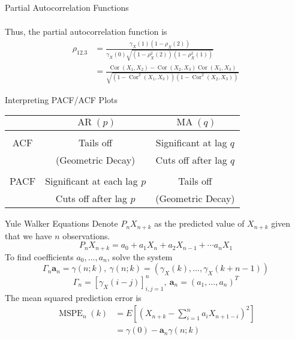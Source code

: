 \documentclass{article}
\DeclareMathOperator{\Cor}{Cor}
\DeclareMathOperator{\ar}{AR}
\DeclareMathOperator{\mspe}{MSPE}
\DeclareMathOperator{\ma}{MA}
\begin{document}
\begin{multicols*}{3}
\begin{blackbox}{Partial Autocorrelation Functions}
\begin{enumerate}[label=\roman*), leftmargin=7pt]
\begin{align*}
        \end{align*}
        Thus, the partial autocorrelation function is
        \vspace{-1ex}
        \begin{align*}
            \rho_{12.3} &= \frac{\gamma_X(1)(1-\rho_X(2))}{\gamma_X(0)\sqrt{(1-\rho_X^2(2))(1-\rho_X^2(1))}}\\
            &= \frac{\Cor(X_1,X_2) - \Cor(X_2,X_3)\Cor(X_1,X_3)}{\sqrt{(1-\Cor^2(X_1,X_3))(1-\Cor^2(X_2,X_3))}}
        \end{align*}
    \end{enumerate}
\end{blackbox}
\begin{blackbox}{Interpreting PACF/ACF Plots}
    \begin{center}
        \begin{tabular}{c|c|c}
            & $\ar(p)$ & $\ma(q)$\\ 
            \hline
        & &  \\
        ACF & Tails off & Significant at lag $q$ \\
        &  (Geometric Decay) & Cuts off after lag $q$ \\
        \hline
        & & \\
        PACF & Significant at each lag $p$ & Tails off \\
        & Cuts off after lag $p$ & (Geometric Decay) \\
        \end{tabular}
    \end{center}
\end{blackbox}

\begin{blackbox}{Yule Walker Equations}
    Denote $P_{n}X_{n+k}$ as the predicted value of $X_{n+k}$ given that we have $n$ observations. 
    \[P_nX_{n+k} = a_0 + a_1X_{n} + a_2X_{n-1} + \cdots a_nX_1\]  
    To find coefficients $a_0,\ldots, a_n$, solve the system 
    \[\Gamma_n\textbf{a}_n = \gamma(n;k), \ \gamma(n;k) = \left(\gamma_X(k), \ldots, \gamma_X(k+n-1)\right)\]
    \[\Gamma_n = \left[\gamma_X(i-j)\right]^n_{i,j=1}, \ \textbf{a}_n = (a_1, \ldots, a_n)^T\]   
    The mean squared prediction error is 
    \begin{align*}
        \mspe_n(k) &= E\left[\left(X_{n+k} - \sum_{i=1}^na_iX_{ n+1-    i}\right)^2\right]\\
        &= \gamma(0) - \textbf{a}_n\gamma(n;k)  
    \end{align*}
\end{blackbox}

\end{multicols*}
\end{document}
